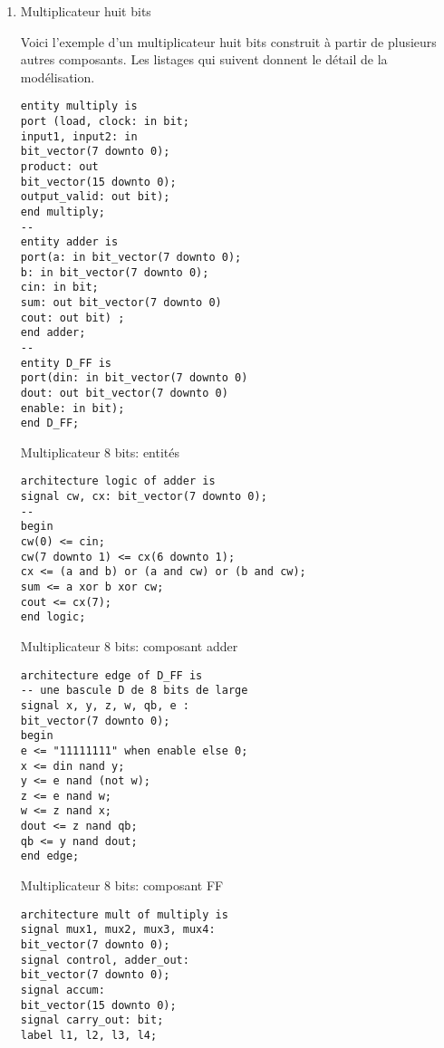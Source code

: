 \documentclass[letter, oneside]{book}
\begin{document}
\begin{enumerate}
\item Multiplicateur huit bits
\label{sec:org8117761}

Voici l'exemple d'un multiplicateur huit bits construit à partir de
plusieurs autres composants.  Les listages qui suivent donnent le
détail de la modélisation.

\begin{listing}[htbp]
\begin{verbatim}
entity multiply is
port (load, clock: in bit;
input1, input2: in
bit_vector(7 downto 0);
product: out
bit_vector(15 downto 0);
output_valid: out bit);
end multiply;
--
entity adder is
port(a: in bit_vector(7 downto 0);
b: in bit_vector(7 downto 0);
cin: in bit;
sum: out bit_vector(7 downto 0)
cout: out bit) ;
end adder;
--
entity D_FF is
port(din: in bit_vector(7 downto 0)
dout: out bit_vector(7 downto 0)
enable: in bit);
end D_FF;
\end{verbatim}
\caption{Multiplicateur 8 bits: entités}
\end{listing}

\begin{listing}[htbp]
\begin{verbatim}
architecture logic of adder is
signal cw, cx: bit_vector(7 downto 0);
--
begin
cw(0) <= cin;
cw(7 downto 1) <= cx(6 downto 1);
cx <= (a and b) or (a and cw) or (b and cw);
sum <= a xor b xor cw;
cout <= cx(7);
end logic;
\end{verbatim}
\caption{Multiplicateur 8 bits: composant adder}
\end{listing}

\begin{listing}[htbp]
\begin{verbatim}
architecture edge of D_FF is
-- une bascule D de 8 bits de large
signal x, y, z, w, qb, e :
bit_vector(7 downto 0);
begin
e <= "11111111" when enable else 0;
x <= din nand y;
y <= e nand (not w);
z <= e nand w;
w <= z nand x;
dout <= z nand qb;
qb <= y nand dout;
end edge;
\end{verbatim}
\caption{Multiplicateur 8 bits: composant FF}
\end{listing}


\begin{listing}[htbp]
\begin{verbatim}
architecture mult of multiply is
signal mux1, mux2, mux3, mux4:
bit_vector(7 downto 0);
signal control, adder_out:
bit_vector(7 downto 0);
signal accum:
bit_vector(15 downto 0);
signal carry_out: bit;
label l1, l2, l3, l4;


\end{verbatim}
\end{listing}
\end{enumerate}
\end{document}
